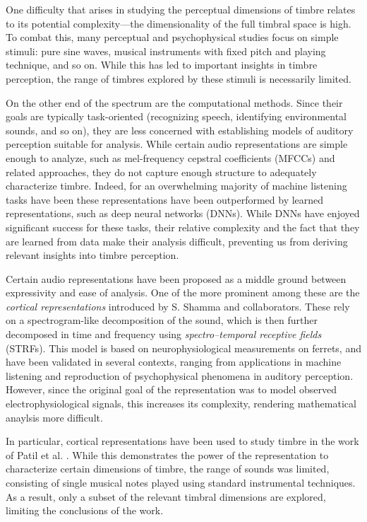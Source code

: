 \documentclass{article}
\begin{document}
One difficulty that arises in studying the perceptual dimensions of timbre relates to its potential complexity---the dimensionality of the full timbral space is high.
To combat this, many perceptual and psychophysical studies focus on simple stimuli: pure sine waves, musical instruments with fixed pitch and playing technique, and so on.
While this has led to important insights in timbre perception, the range of timbres explored by these stimuli is necessarily limited.

On the other end of the spectrum are the computational methods.
Since their goals are typically task-oriented (recognizing speech, identifying environmental sounds, and so on), they are less concerned with establishing models of auditory perception suitable for analysis.
While certain audio representations are simple enough to analyze, such as mel-frequency cepstral coefficients (MFCCs) and related approaches, they do not capture enough structure to adequately characterize timbre.
Indeed, for an overwhelming majority of machine listening tasks have been these representations have been outperformed by learned representations, such as deep neural networks (DNNs).
While DNNs have enjoyed significant success for these tasks, their relative complexity and the fact that they are learned from data make their analysis difficult, preventing us from deriving relevant insights into timbre perception.

Certain audio representations have been proposed as a middle ground between expressivity and ease of analysis.
One of the more prominent among these are the \emph{cortical representations} introduced by S. Shamma and collaborators.
These rely on a spectrogram-like decomposition of the sound, which is then further decomposed in time and frequency using \emph{spectro--temporal receptive fields} (STRFs).
This model is based on neurophysiological measurements on ferrets, and have been validated in several contexts, ranging from applications in machine listening and reproduction of psychophysical phenomena in auditory perception.
However, since the original goal of the representation was to model observed electrophysiological signals, this increases its complexity, rendering mathematical anaylsis more difficult.

In particular, cortical representations have been used to study timbre in the work of Patil et al. \cite{patil2012music}.
While this demonstrates the power of the representation to characterize certain dimensions of timbre, the range of sounds was limited, consisting of single musical notes played using standard instrumental techniques.
As a result, only a subset of the relevant timbral dimensions are explored, limiting the conclusions of the work.
\end{document}
